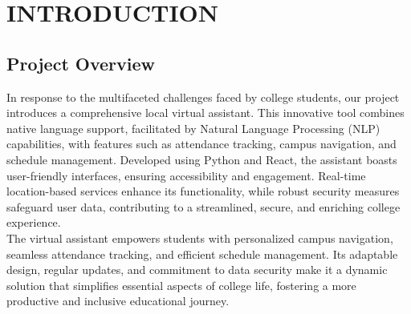 \documentclass[12pt,a4paper]{report}
\begin{document}
\newpage
{}
\chapter{INTRODUCTION}
\section{Project Overview}
In response to the multifaceted challenges faced by college students, our project introduces a comprehensive local virtual assistant. This innovative tool combines native language support, facilitated by Natural Language Processing (NLP) capabilities, with features such as attendance tracking, campus navigation, and schedule management. Developed using Python and React, the assistant boasts user-friendly interfaces, ensuring accessibility and engagement. Real-time location-based services enhance its functionality, while robust security measures safeguard user data, contributing to a streamlined, secure, and enriching college experience.\\

\hspace*{35pt}The virtual assistant empowers students with personalized campus navigation, seamless attendance tracking, and efficient schedule management. Its adaptable design, regular updates, and commitment to data security make it a dynamic solution that simplifies essential aspects of college life, fostering a more productive and inclusive educational journey.
\end{document}
